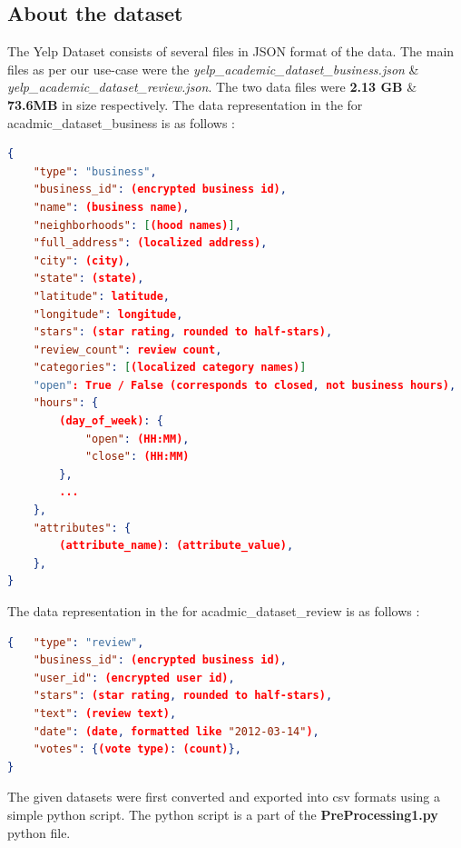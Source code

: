 \documentclass[paper=a4, fontsize=11pt]{scrartcl} %
\numberwithin{equation}{section} %
\numberwithin{figure}{section} %
\numberwithin{table}{section} %
\begin{document}
\subsection{About the dataset}
The Yelp Dataset consists of several files in JSON format of the data. The main files as per our use-case were the \textit{yelp\_academic\_dataset\_business.json} \& \textit{yelp\_academic\_dataset\_review.json}. The two data files were \textbf{2.13 GB} \& \textbf{73.6MB} in size respectively. The data representation in the for acadmic\_dataset\_business is as follows : \\
\begin{lstlisting}[language=json]
{
    "type": "business",
    "business_id": (encrypted business id),
    "name": (business name),
    "neighborhoods": [(hood names)],
    "full_address": (localized address),
    "city": (city),
    "state": (state),
    "latitude": latitude,
    "longitude": longitude,
    "stars": (star rating, rounded to half-stars),
    "review_count": review count,
    "categories": [(localized category names)]
    "open": True / False (corresponds to closed, not business hours),
    "hours": {
        (day_of_week): {
            "open": (HH:MM),
            "close": (HH:MM)
        },
        ...
    },
    "attributes": {
        (attribute_name): (attribute_value),
    },
}
\end{lstlisting}
The data representation in the for acadmic\_dataset\_review is as follows : \\
\begin{lstlisting}[language=json]
{   "type": "review",
    "business_id": (encrypted business id),
    "user_id": (encrypted user id),
    "stars": (star rating, rounded to half-stars),
    "text": (review text),
    "date": (date, formatted like "2012-03-14"),
    "votes": {(vote type): (count)},
}
\end{lstlisting}
The given datasets were first converted and exported into csv formats using a simple python script. The python script is a part of the \textbf{PreProcessing1.py} python file.

\end{document}
